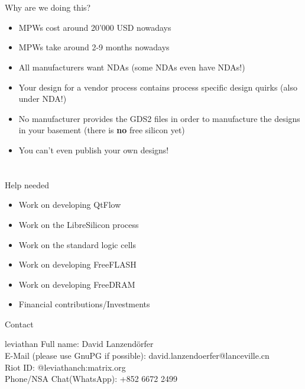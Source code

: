 \documentclass[9pt]{beamer}
\begin{document}
\section[Why]{}
\begin{frame}{Why are we doing this?}
	\begin{itemize}
		\item MPWs cost around 20'000 USD nowadays
		\item MPWs take around 2-9 months nowadays
		\item All manufacturers want NDAs (some NDAs even have NDAs!)
		\item Your design for a vendor process contains process specific design quirks (also under NDA!)
		\item No manufacturer provides the GDS2 files in order to manufacture the designs in your basement (there is \textbf{no} free silicon yet)
		\item You can't even publish your own designs!
	\end{itemize}
\end{frame}

\section[Conclusion]{}

\begin{frame}{Help needed}
	\begin{itemize}
		\item Work on developing QtFlow\footnotemark
		\item Work on the LibreSilicon process\footnotemark
		\item Work on the standard logic cells
		\item Work on developing FreeFLASH
		\item Work on developing FreeDRAM
		\item Financial contributions/Investments
	\end{itemize}

\end{frame}

\begin{frame}{Contact}
	\begin{block}{leviathan}
		Full name: David Lanzendörfer \\
		E-Mail (please use GnuPG if possible): david.lanzendoerfer@lanceville.cn \\
		Riot ID: @leviathanch:matrix.org \\
		Phone/NSA Chat(WhatsApp): +852 6672 2499		
	\end{block}
\end{frame}
\end{document}
